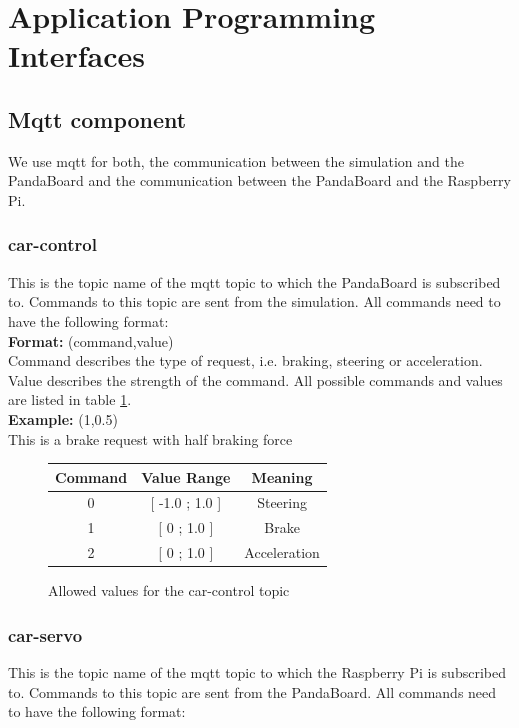 \section{Application Programming Interfaces}

\subsection{Mqtt component}
We use mqtt for both, the communication between the simulation and the PandaBoard and the communication between the PandaBoard and the Raspberry Pi.

\subsubsection{car-control}
This is the topic name of the mqtt topic to which the PandaBoard is subscribed to. Commands to this topic are sent from the simulation. All commands need to have the following format: \\

\textbf{Format:} (command,value) \\
Command describes the type of request, i.e. braking, steering or acceleration. Value describes the strength of the command. All possible commands and values are listed in table \ref{tab:car-control}. \\

\textbf{Example:} (1,0.5) \\
This is a brake request with half braking force \\

\begin{figure}[h]
    \centering
    \begin{tabular}{c | c | c}
        \textbf{Command} & \textbf{Value Range} & \textbf{Meaning} \\ \hline
        0   &   [ -1.0 ; 1.0 ]    & Steering \\
        1   &   [ 0 ; 1.0 ]       & Brake \\ 
        2   &   [ 0 ; 1.0 ]       & Acceleration \\ 
    \end{tabular}
    \caption{Allowed values for the car-control topic}
    \label{tab:car-control}
\end{figure}


\subsubsection{car-servo}
This is the topic name of the mqtt topic to which the Raspberry Pi is subscribed to. Commands to this topic are sent from the PandaBoard. All commands need to have the following format: \\ 


